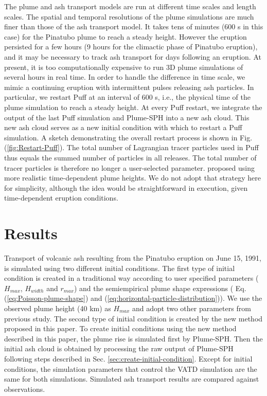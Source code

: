 \documentclass[utf8]{frontiersSCNS} %
\begin{document}
The plume and ash transport models are run at different time scales and length scales. The spatial and temporal resolutions of the plume simulations are much finer than those of the ash transport model. It takes tens of minutes (600 s in this case) for the Pinatubo plume to reach a steady height. However the eruption persisted for a few hours (9 hours for the climactic phase of Pinatubo eruption), and it may be necessary to track ash transport for days following an eruption. At present, it is too computationally expensive to run 3D plume simulations of several hours in real time. In order to handle the difference in time scale, we mimic a continuing eruption with intermittent pulses releasing ash particles. In particular, we restart Puff at an interval of 600 s, i.e., the physical time of the plume simulation to reach a steady height. At every Puff restart, we integrate the output of the last Puff simulation and Plume-SPH into a new ash cloud. This new ash cloud serves as a new initial condition with which to restart a Puff simulation. A sketch demonstrating the overall restart process is shown in Fig. (\ref{fig:Restart-Puff}). The total number of Lagrangian tracer particles used in Puff thus equals the summed number of particles in all releases. The total number of tracer particles is therefore no longer a user-selected parameter. \citet{fero2008simulation} proposed using more realistic time-dependent plume heights. We do not adopt that strategy here for simplicity, although the idea would be straightforward in execution, given time-dependent eruption conditions.

\section{Results}

Transport of volcanic ash resulting from the Pinatubo eruption on June 15, 1991, is simulated using two different initial conditions.
The first type of initial condition is created in a traditional way according to user specified parameters ($H_{max}$, $H_{width}$ and $r_{max}$) and the semiempirical plume shape expressions ( Eq. (\ref{eq:Poisson-plume-shape}) and (\ref{eq:horizontal-particle-distribution})). We use the observed plume height (40 km) as $H_{max}$ and adopt two other parameters from previous study\citep{fero2008simulation}. The second type of initial condition is created by the new method proposed in this paper. To create initial conditions using the new method described in this paper, the plume rise is simulated first by Plume-SPH. Then the initial ash cloud is obtained by processing the raw output of Plume-SPH following steps described in Sec. \ref{sec:create-initial-condition}. Except for initial conditions, the simulation parameters that control the VATD simulation are the same for both simulations. Simulated ash transport results are compared against observations.
\end{document}
